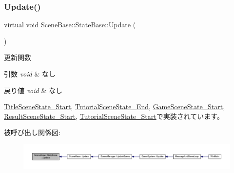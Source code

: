 \mbox{\label{class_scene_base_1_1_state_base_ad2c6c8fd9f020eb02f64f394edee129c}} 
\subsubsection{\texorpdfstring{Update()}{Update()}}
{\footnotesize\ttfamily virtual void Scene\+Base\+::\+State\+Base\+::\+Update (\begin{DoxyParamCaption}{ }\end{DoxyParamCaption})\hspace{0.3cm}{\ttfamily [pure virtual]}}



更新関数 


\begin{DoxyParams}{引数}
{\em void} & なし \\
\hline
\end{DoxyParams}

\begin{DoxyRetVals}{戻り値}
{\em void} & なし \\
\hline
\end{DoxyRetVals}


\mbox{\hyperlink{class_title_scene_state___start_a2e98cf6810711b58766d7147168d02eb}{Title\+Scene\+State\+\_\+\+Start}}, \mbox{\hyperlink{class_tutorial_scene_state___end_a7cdf03fa9a0e41ab86c2b41b8165ad09}{Tutorial\+Scene\+State\+\_\+\+End}}, \mbox{\hyperlink{class_game_scene_state___start_ae11bb8d8ea9eae4fea2a9acf33dd1c8b}{Game\+Scene\+State\+\_\+\+Start}}, \mbox{\hyperlink{class_result_scene_state___start_a2ecdef2bef0cd1a04055e8687e11199b}{Result\+Scene\+State\+\_\+\+Start}}, \mbox{\hyperlink{class_tutorial_scene_state___start_a93c322692bf56172f383d3e5b17cd85c}{Tutorial\+Scene\+State\+\_\+\+Start}}で実装されています。

被呼び出し関係図\+:
\nopagebreak
\begin{figure}[H]
\begin{center}
\leavevmode
\includegraphics[width=350pt]{class_scene_base_1_1_state_base_ad2c6c8fd9f020eb02f64f394edee129c_icgraph}
\end{center}
\end{figure}


